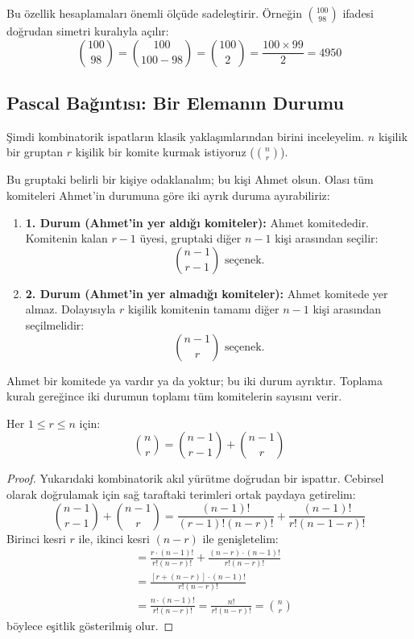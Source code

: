 Bu özellik hesaplamaları önemli ölçüde sadeleştirir. Örneğin $\binom{100}{98}$ ifadesi doğrudan simetri kuralıyla açılır:
\[ \binom{100}{98} = \binom{100}{100 - 98} = \binom{100}{2} = \frac{100 \times 99}{2} = 4950 \]

\subsection{Pascal Bağıntısı: Bir Elemanın Durumu}

Şimdi kombinatorik ispatların klasik yaklaşımlarından birini inceleyelim. $n$ kişilik bir gruptan $r$ kişilik bir komite kurmak istiyoruz ($\binom{n}{r}$). 

Bu gruptaki belirli bir kişiye odaklanalım; bu kişi Ahmet olsun. Olası tüm komiteleri Ahmet'in durumuna göre iki ayrık duruma ayırabiliriz:
\begin{enumerate}
  \item \textbf{1. Durum (Ahmet'in yer aldığı komiteler):} Ahmet komitededir. Komitenin kalan $r - 1$ üyesi, gruptaki diğer $n - 1$ kişi arasından seçilir:
  \[ \binom{n - 1}{r - 1} \text{ seçenek.} \]
  \item \textbf{2. Durum (Ahmet'in yer almadığı komiteler):} Ahmet komitede yer almaz. Dolayısıyla $r$ kişilik komitenin tamamı diğer $n - 1$ kişi arasından seçilmelidir:
  \[ \binom{n - 1}{r} \text{ seçenek.} \]
\end{enumerate}

Ahmet bir komitede ya vardır ya da yoktur; bu iki durum ayrıktır. Toplama kuralı gereğince iki durumun toplamı tüm komitelerin sayısını verir.

\begin{theorem}
Her $1 \le r \le n$ için:
\[ \binom{n}{r} = \binom{n - 1}{r - 1} + \binom{n - 1}{r} \]
\end{theorem}
\begin{proof}
Yukarıdaki kombinatorik akıl yürütme doğrudan bir ispattır. Cebirsel olarak doğrulamak için sağ taraftaki terimleri ortak paydaya getirelim:
\[ \binom{n - 1}{r - 1} + \binom{n - 1}{r} = \frac{(n-1)!}{(r-1)!(n-r)!} + \frac{(n-1)!}{r!(n-1-r)!} \]
Birinci kesri $r$ ile, ikinci kesri $(n - r)$ ile genişletelim:
\begin{align*}
&= \frac{r \cdot (n-1)!}{r!(n-r)!} + \frac{(n-r) \cdot (n-1)!}{r!(n-r)!} \\
&= \frac{[r + (n - r)] \cdot (n-1)!}{r!(n-r)!} \\
&= \frac{n \cdot (n-1)!}{r!(n-r)!} = \frac{n!}{r!(n-r)!} = \binom{n}{r}
\end{align*}
böylece eşitlik gösterilmiş olur.
\end{proof}

